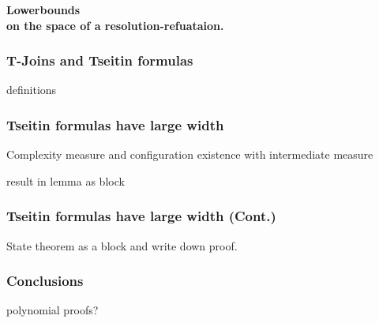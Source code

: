 \documentclass[t,usenames,dvipsnames]{beamer}
\begin{document}
\begin{frame}[c]
	\color{NavyBlue} \centering \Large \textbf{
	Lowerbounds\\on the space of a resolution-refuataion.}
\end{frame}

\begin{frame} \frametitle{T-Joins and Tseitin formulas}
	definitions
\end{frame}

\begin{frame} \frametitle{Tseitin formulas have large width}
	Complexity measure and configuration existence with intermediate measure

	result in lemma  as block
\end{frame}

\begin{frame} \frametitle{Tseitin formulas have large width (Cont.)}
	State theorem as a block and write down proof.
\end{frame}

\begin{frame} \frametitle{Conclusions}
polynomial proofs?	
\end{frame}
\end{document}
